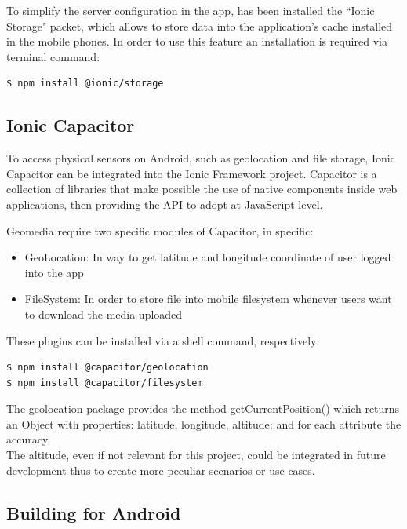 \documentclass[conference]{IEEEtran}
\begin{document}
To simplify the server configuration in the app, has been installed the ``Ionic Storage" \cite{b9} packet, which allows to store data into the application's cache installed in the mobile phones. In order to use this feature an installation is required via terminal command: 
\begin{lstlisting}[language=Sh]
$ npm install @ionic/storage
\end{lstlisting}



\subsection{Ionic Capacitor}

To access physical sensors on Android, such as geolocation and file storage, Ionic Capacitor\cite{b10} can be integrated into the Ionic Framework project. Capacitor is a collection of libraries that make possible the use of native components inside web applications, then providing the API to adopt at JavaScript level.

Geomedia require two specific modules of Capacitor, in specific:
\begin{itemize}
    \item GeoLocation\cite{b2}: In way to get latitude and longitude coordinate of user logged into the app
    \item FileSystem\cite{b3}: In order to store file into mobile filesystem whenever users want to download the media uploaded
\end{itemize}

These plugins can be installed via a shell command, respectively:
\begin{lstlisting}[language=Sh]
$ npm install @capacitor/geolocation
$ npm install @capacitor/filesystem
\end{lstlisting}

The geolocation package provides the method getCurrentPosition() which returns an Object with properties: latitude, longitude, altitude; and for each attribute the accuracy.
\\
The altitude, even if not relevant for this project, could be integrated in future development thus to create more peculiar scenarios or use cases.


\subsection{Building for Android}
\end{document}
